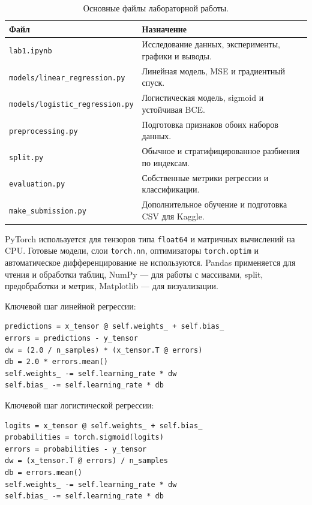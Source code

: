 \documentclass[a4paper,12pt]{article}
\newcommand{\code}[1]{\texttt{#1}}
\begin{document}
\begin{table}[H]
    \centering
    \caption{Основные файлы лабораторной работы.}
    \small
    \begin{tabularx}{\linewidth}{@{}lX@{}}
        \toprule
        Файл & Назначение\\
        \midrule
        \code{lab1.ipynb} & Исследование данных, эксперименты, графики и выводы.\\
        \code{models/linear\_regression.py} & Линейная модель, MSE и градиентный спуск.\\
        \code{models/logistic\_regression.py} & Логистическая модель, sigmoid и устойчивая BCE.\\
        \code{preprocessing.py} & Подготовка признаков обоих наборов данных.\\
        \code{split.py} & Обычное и стратифицированное разбиения по индексам.\\
        \code{evaluation.py} & Собственные метрики регрессии и классификации.\\
        \code{make\_submission.py} & Дополнительное обучение и подготовка CSV для Kaggle.\\
        \bottomrule
    \end{tabularx}
\end{table}

PyTorch используется для тензоров типа \code{float64} и матричных
вычислений на CPU. Готовые модели, слои \code{torch.nn},
оптимизаторы \code{torch.optim} и автоматическое дифференцирование
не используются. Pandas применяется для чтения и обработки таблиц,
NumPy --- для работы с массивами, split, предобработки и метрик,
Matplotlib --- для визуализации.

Ключевой шаг линейной регрессии:
\begin{lstlisting}
predictions = x_tensor @ self.weights_ + self.bias_
errors = predictions - y_tensor
dw = (2.0 / n_samples) * (x_tensor.T @ errors)
db = 2.0 * errors.mean()
self.weights_ -= self.learning_rate * dw
self.bias_ -= self.learning_rate * db
\end{lstlisting}

Ключевой шаг логистической регрессии:
\begin{lstlisting}
logits = x_tensor @ self.weights_ + self.bias_
probabilities = torch.sigmoid(logits)
errors = probabilities - y_tensor
dw = (x_tensor.T @ errors) / n_samples
db = errors.mean()
self.weights_ -= self.learning_rate * dw
self.bias_ -= self.learning_rate * db
\end{lstlisting}
\end{document}
